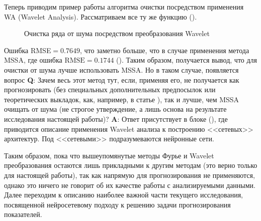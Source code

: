 Теперь приводим пример работы алгоритма очистки посредством применения WA (Wavelet Analysis). Рассматриваем все ту же функцию ().
\begin{figure}[H]
	\centering
	\caption{Очистка ряда от шума посредством преобразования Wavelet}
\end{figure}
Ошибка RMSE$= 0.7649$, что заметно больше, что в случае применения метода MSSA, где ошибка $\text{RMSE} = 0.1744$ (). Таким образом, получается вывод, что для очистки от шума лучше использовать MSSA. Но в таком случае, появляется вопрос \textbf{Q}: Зачем весь этот метод тут, если, применяя его, не получается как прогнозировать (без специальных дополнительных предпосылок или теоретических выкладок, как, например, в статье \cite{schluter2010using}), так и лучше, чем MSSA очищать от шума (не строгое утверждение, а лишь основа на результате исследования настоящей работы)? \textbf{A}: Ответ присутствует в блоке (), где приводится описание применения Wavelet анализа к построению <<сетевых>> архитектур. Под <<сетевыми>> подразумеваются нейронные сети.

Таким образом, пока что вышеупомянутые методы Фурье и Wavelet преобразования остаются лишь прикладными к другим методам (это верно только для настоящей работы), так как напрямую для прогнозирования не применяются, однако это ничего не говорит об их качестве работы с анализируемыми данными. Далее переходим к описанию наиболее важной части текущего исследования, посвященной нейросетевому подходу к решению задачи прогнозирования показателей.